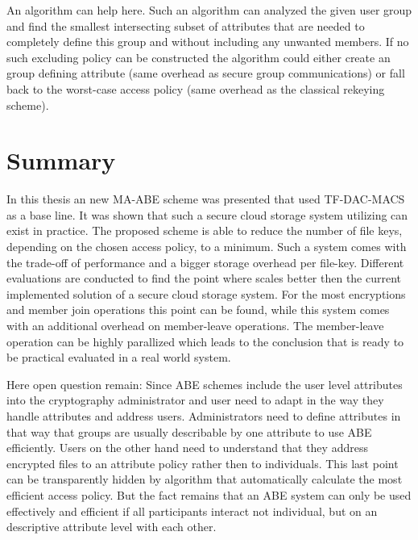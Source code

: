 An algorithm can help here. Such an algorithm can analyzed the given user group and find the smallest intersecting subset of attributes that are needed to completely define this group and without including any unwanted members. If no such excluding policy can be constructed the algorithm could either create an group defining attribute (same overhead as secure group communications) or fall back to the worst-case access policy (same overhead as the classical rekeying scheme). 

\section{Summary}
In this thesis an new MA-ABE scheme was presented that used TF-DAC-MACS as a base line. It was shown that such a secure cloud storage system utilizing \name can exist in practice. The proposed scheme is able to reduce the number of file keys, depending on the chosen access policy, to a minimum. Such a system comes with the trade-off of performance and a bigger storage overhead per file-key. Different evaluations are conducted to find the point where \name scales better then the current implemented solution of a secure cloud storage system. For the most encryptions and member join operations this point can be found, while this system comes with an additional overhead on member-leave operations. The member-leave operation can be highly parallized which leads to the conclusion that \name is ready to be practical evaluated in a real world system. 

Here open question remain: Since ABE schemes include the user level attributes into the cryptography administrator and user need to adapt in the way they handle attributes and address users. Administrators need to define attributes in that way that groups are usually describable by one attribute to use ABE efficiently. Users on the other hand need to understand that they address encrypted files to an attribute policy rather then to individuals. This last point can be transparently hidden by algorithm that automatically calculate the most efficient access policy. But the fact remains that an ABE system can only be used effectively and efficient if all participants interact not individual, but on an descriptive attribute level with each other. 

